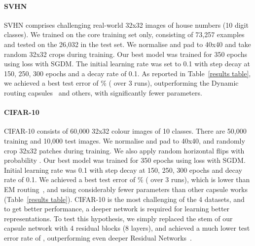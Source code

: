 \documentclass[letterpaper]{article} \usepackage{aaai20}  \usepackage{times}  \usepackage{helvet} \usepackage{courier}  \usepackage[hyphens]{url}  \usepackage{graphicx} \urlstyle{rm} \def\UrlFont{\rm}  \usepackage{graphicx}  \frenchspacing  \setlength{\pdfpagewidth}{8.5in}  \setlength{\pdfpageheight}{11in}  \nocopyright
\begin{document}
\paragraph{SVHN}
SVHN comprises challenging real-world 32x32 images of house numbers (10 digit classes). We trained on the core training set only, consisting of 73,257 examples and tested on the 26,032 in the test set. We normalise and pad to 40x40 and take random 32x32 crops during training. Our best model  was trained for 350 epochs using  loss with SGDM. The initial learning rate was set to 0.1 with step decay at 150, 250, 300 epochs and a decay rate of 0.1. As reported in Table~\ref{results table}, we achieved a best test error of \% ( over 3 runs), outperforming the Dynamic routing capsules~\cite{sabour2017dynamic} and others, with significantly fewer parameters.
\paragraph{CIFAR-10}
CIFAR-10 consists of 60,000 32x32 colour images of 10 classes. There are 50,000 training and 10,000 test images. We normalise and pad to 40x40, and randomly crop 32x32 patches during training. We also apply random horizontal flips with probability . Our best model  was trained for 350 epochs using  loss with SGDM. Initial learning rate was 0.1 with step decay at 150, 250, 300 epochs and decay rate of 0.1. We achieved a best test error of \% ( over 3 runs), which is lower than EM routing~\cite{hinton2018matrix}, and using considerably fewer parameters than other capsule works (Table~\ref{results table}). CIFAR-10 is the most challenging of the 4 datasets, and to get better performance, a deeper network is required for learning better representations. To test this hypothesis, we simply replaced the stem of our capsule network with 4 residual blocks (8 layers), and achieved a much lower test error rate of , outperforming even deeper Residual Networks~\cite{he2016deep}.
\end{document}

